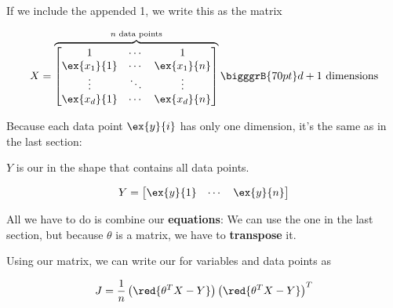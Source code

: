         If we include the appended 1, we write this as the  matrix
        
        \begin{equation}
                X = 
                    \overbrace{
                        \begin{bmatrix}
                            1           & \cdots & 1           \\
                            \ex{x_1}{1} & \cdots  & \ex{x_1}{n} \\
                            \vdots      & \ddots & \vdots      \\
                            \ex{x_d}{1} & \cdots  & \ex{x_d}{n}
                        \end{bmatrix}
                        }^{ n \text{ data points}}
                    \bigggrB{70pt} d+1 \text{ dimensions}
        \end{equation}
        
        Because each data point $\ex{y}{i}$ has only one dimension, it's the same as in the last section:\\
        
        \begin{kequation}
            $Y$ is our  in the shape  that contains all data points.
            
            \begin{equation*}
                Y = 
                    \begin{bmatrix}
                        \ex{y}{1} & \cdots & \ex{y}{n}
                    \end{bmatrix}
            \end{equation*}
        \end{kequation}
        
        All we have to do is combine our \textbf{equations}: We can use the one in the last section, but because $\theta$ is a matrix, we have to \textbf{transpose} it.\\
        
        \begin{kequation}
            Using our  matrix, we can write our  for  variables and  data points as
            
            \begin{equation*}
                J = \frac{1}{n}
                    \left( \red{ \theta^T X - Y} \right)
                    \left( \red{ \theta^T X - Y} \right)^T
            \end{equation*}
        \end{kequation}
        
